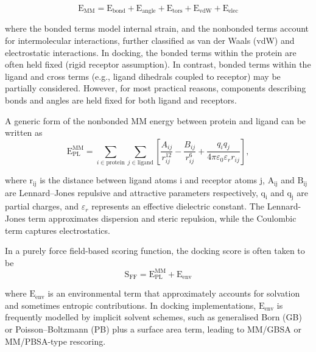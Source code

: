 \documentclass[12pt]{article}
\begin{document}
\begin{equation}
    \textrm{E}_{\textrm{MM}} = \textrm{E}_{\textrm{bond}} + \textrm{E}_{\textrm{angle}} + \textrm{E}_{\textrm{tors}} + \textrm{E}_{\textrm{vdW}} + \textrm{E}_{\textrm{elec}}
\label{eq:FF_general}
\end{equation}

where the bonded terms model internal strain, and the nonbonded terms account for intermolecular interactions, further classified as van der Waals (vdW) and electrostatic interactions. In docking, the bonded terms within the protein are often held fixed (rigid receptor assumption). In contrast, bonded terms within the ligand and cross terms (e.g., ligand dihedrals coupled to receptor) may be partially considered. However, for most practical reasons, components describing bonds and angles are held fixed for both ligand and receptors. 

A generic form of the nonbonded MM energy between protein and ligand can be written as
\begin{equation}
    \textrm{E}_{\textrm{PL}}^{\textrm{MM}} =
    \sum_{i  \in  \textrm{protein}} \sum_{j  \in  \textrm{ligand}}
    \left[
    \frac{A_{ij}}{r_{ij}^{12}}
    -
    \frac{B_{ij}}{r_{ij}^{6}}
    +
    \frac{q_i q_j}{4\pi \varepsilon_0 \varepsilon_r r_{ij}}
    \right],
\label{eq:MM_nonbonded}
\end{equation}

where $\textrm{r}_{\textrm{ij}}$ is the distance between ligand atoms i and receptor atoms j, $\textrm{A}_{\textrm{ij}}$ and $\textrm{B}_{\textrm{ij}}$ are Lennard--Jones repulsive and attractive parameters respectively, $\textrm{q}_\textrm{i}$ and $\textrm{q}_\textrm{j}$ are partial charges, and $\varepsilon_r$ represents an effective dielectric constant. The Lennard-Jones term approximates dispersion and steric repulsion, while the Coulombic term captures electrostatics. 

In a purely force field-based scoring function, the docking score is often taken to be
\begin{equation}
    \textrm{S}_{\textrm{FF}} = \textrm{E}_{\textrm{PL}}^{\textrm{MM}} + \textrm{E}_{\textrm{env}}
\label{eq:MM_scoring}
\end{equation}

where $\textrm{E}_{\textrm{env}}$ is an environmental term that approximately accounts for solvation and sometimes entropic contributions. In docking implementations, $\textrm{E}_{\textrm{env}}$ is frequently modelled by implicit solvent schemes, such as generalised Born (GB) or Poisson--Boltzmann (PB) plus a surface area term, leading to MM/GBSA or MM/PBSA-type rescoring\cite{CH3_wang2019end}. 
\end{document}
